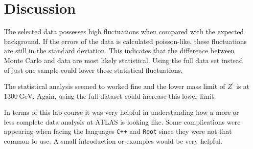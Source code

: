 \section{Discussion}
\label{sec:Diskussion}
The selected data possesses high fluctuations when compared with the expected background.
If the errors of the data is calculated poisson-like, these fluctuations are still in the standard deviation.
This indicates that the difference between Monte Carlo and data are most likely statistical.
Using the full data set instead of just one sample could lower these statistical fluctuations.


The statistical analysis seemed to worked fine and the lower mass limit of $Z^\prime$ is at $\SI{1300}{\giga\electronvolt}$.
Again, using the full dataset could increase this lower limit.

In terms of this lab course it was very helpful in understanding how a more or less complete data analysis at ATLAS is looking like.
Some complications were appearing when facing the languages \texttt{C++} and \texttt{Root} since they were not that common to use.
A small introduction or examples would be very helpful.
